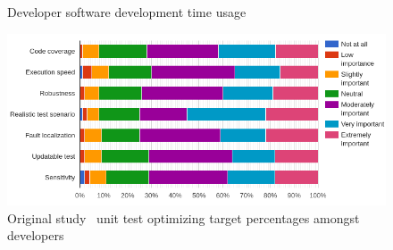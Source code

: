     \begin{figure}[ht]%
        \centering
        \qquad
        \caption{Developer software development time usage}%
        \label{fig:example}%
    \end{figure}

    \begin{figure}[ht]
      \begin{center}
        \includegraphics[width=16.7cm]{images/optimize-org.png}
        \caption{Original study~\cite{daka2014survey} unit test optimizing target percentages amongst developers}
        \label{fig:TDD}
      \end{center}
    \end{figure}

